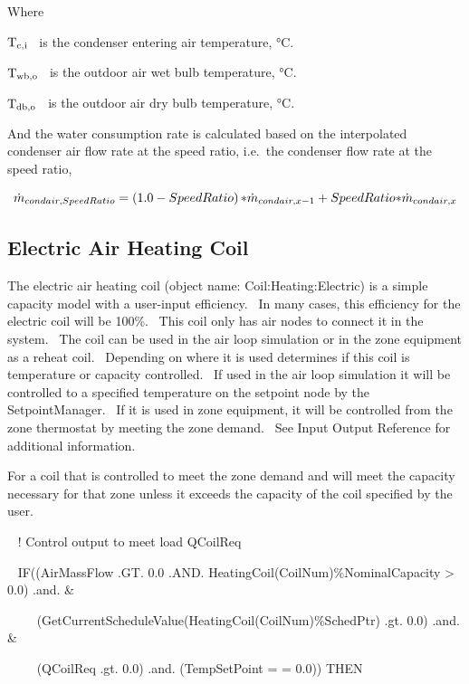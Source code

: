 Where

\({{\rm{T}}_{{\rm{c}},{\rm{i}}}}\) ~is the condenser entering air temperature, °C.

\({{\rm{T}}_{{\rm{wb}},{\rm{o}}}}\) ~is the outdoor air wet bulb temperature, °C.

\({{\rm{T}}_{{\rm{db}},{\rm{o}}}}\) ~is the outdoor air dry bulb temperature, °C.

And the water consumption rate is calculated based on the interpolated condenser air flow rate at the speed ratio, i.e.~the condenser flow rate at the speed ratio,

\begin{equation}
{\dot m_{condair,{\rm{}}SpeedRatio}} = \left( {1.0 - SpeedRatio} \right){\rm{*}}{\dot m_{condair,{\rm{}}x - 1}} + SpeedRatio{\rm{*}}{\dot m_{condair,{\rm{}}x}}
\end{equation}

\subsection{Electric Air Heating Coil}\label{electric-air-heating-coil}

The electric air heating coil (object name: Coil:Heating:Electric) is a simple capacity model with a user-input efficiency.~ In many cases, this efficiency for the electric coil will be 100\%.~ This coil only has air nodes to connect it in the system.~ The coil can be used in the air loop simulation or in the zone equipment as a reheat coil.~ Depending on where it is used determines if this coil is temperature or capacity controlled.~ If used in the air loop simulation it will be controlled to a specified temperature on the setpoint node by the SetpointManager.~ If it is used in zone equipment, it will be controlled from the zone thermostat by meeting the zone demand.~ See Input Output Reference for additional information.

For a coil that is controlled to meet the zone demand and will meet the capacity necessary for that zone unless it exceeds the capacity of the coil specified by the user.

~ ! Control output to meet load QCoilReq

~ IF((AirMassFlow .GT. 0.0 .AND. HeatingCoil(CoilNum)\%NominalCapacity \textgreater{} 0.0) .and. \&

~~~~ (GetCurrentScheduleValue(HeatingCoil(CoilNum)\%SchedPtr) .gt. 0.0) .and. \&

~~~~ (QCoilReq .gt. 0.0) .and. (TempSetPoint = = 0.0)) THEN


